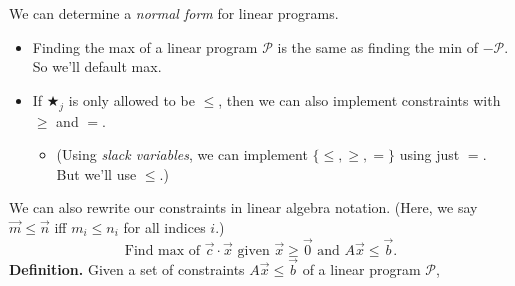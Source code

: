We can determine a \emph{normal form} for linear programs.
\begin{itemize}
    \item Finding the max of a linear program $\mathcal{P}$ is the same as finding the min of $-\mathcal{P}$.  So we'll default max.
    \item If $\bigstar_j$ is only allowed to be $\leq$, then we can also implement constraints with $\geq$ and $=$.
    \begin{itemize}
        \item (Using \emph{slack variables}, we can implement $\{\leq, \geq, =\}$ using just $=$.  But we'll use $\leq$.)
    \end{itemize}
\end{itemize}
We can also rewrite our constraints in linear algebra notation.  (Here, we say $\vec{m} \leq \vec{n}$ iff $m_i \leq n_i$ for all indices $i$.)
\[ \text{Find max of } \vec{c} \cdot \vec{x} \text{ given } \vec{x} \geq \vec{0} \text{ and } A\vec{x} \leq \vec{b}. \]
\textbf{Definition.} Given a set of constraints $A \vec{x} \leq \vec{b}$ of a linear program $\mathcal{P}$,

